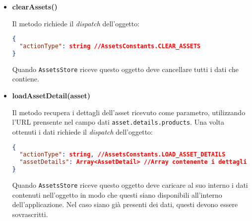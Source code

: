 \begin{itemize}
\item \textbf{clearAssets()}

Il metodo richiede il \textit{dispatch} dell'oggetto:
\begin{lstlisting}[language=JSON, caption=Action - clear assets]
{
  "actionType": string //AssetsConstants.CLEAR_ASSETS
}
\end{lstlisting}

Quando \texttt{AssetsStore} riceve questo oggetto deve cancellare tutti i dati che contiene.

\item \textbf{loadAssetDetail(asset)}

Il metodo recupera i dettagli dell'asset ricevuto come parametro, utilizzando l'URL prensente nel campo dati \texttt{asset.details.products}.
Una volta ottenuti i dati richiede il \textit{dispatch} dell'oggetto:

\begin{lstlisting}[language=JSON, caption=Action - load asset details]
{
  "actionType": string, //AssetsConstants.LOAD_ASSET_DETAILS
  "assetDetails": Array<AssetDetail> //Array contenente i dettagli dell'asset
}
\end{lstlisting}

Quando \texttt{AssetsStore} riceve questo oggetto deve caricare al suo interno i dati contenuti nell'oggetto in modo che questi siano disponibili all'interno dell'applicazione. Nel caso siano già presenti dei dati, questi devono essere sovrascritti.

\end{itemize}